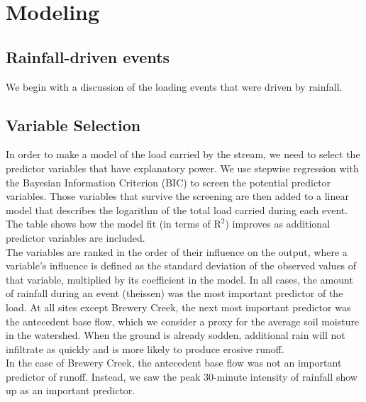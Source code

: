 \section{Modeling}

\subsection{Rainfall-driven events}
We begin with a discussion of the loading events that were driven by rainfall.

\subsection{Variable Selection}
In order to make a model of the load carried by the stream, we need to select the predictor variables that have explanatory power. We use stepwise regression with the Bayesian Information Criterion (BIC) to screen the potential predictor variables. Those variables that survive the screening are then added to a linear model that describes the logarithm of the total load carried during each event. The table shows how the model fit (in terms of $\text{R}^2$) improves as additional predictor variables are included.\\

The variables are ranked in the order of their influence on the output, where a variable's influence is defined as the standard deviation of the observed values of that variable, multiplied by its  coefficient in the model. In all cases, the amount of rainfall during an event (theissen) was the most important predictor of the load. At all sites except Brewery Creek, the next most important predictor was the antecedent base flow, which we consider a proxy for the average soil moisture in the watershed. When the ground is already sodden, additional rain will not infiltrate as quickly and is more likely to produce erosive runoff.\\

In the case of Brewery Creek, the antecedent base flow was not an important predictor of runoff. Instead, we saw the peak 30-minute intensity of rainfall show up as an important predictor.\\

